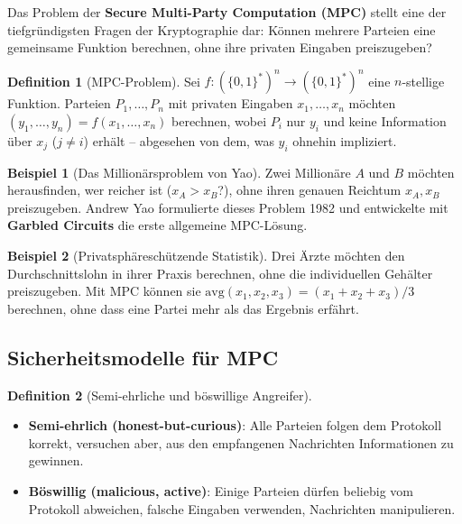 ﻿\documentclass[a4paper,12pt]{scrreprt}
\theoremstyle{definition}
\newtheorem{definition}{Definition}[section]
\newtheorem{beispiel}{Beispiel}[section]
\begin{document}
Das Problem der \textbf{Secure Multi-Party Computation (MPC)} stellt eine der tiefgründigsten Fragen der Kryptographie dar: Können mehrere Parteien eine gemeinsame Funktion berechnen, ohne ihre privaten Eingaben preiszugeben?

\begin{definition}[MPC-Problem]
Sei $f: (\{0,1\}^*)^n \to (\{0,1\}^*)^n$ eine $n$-stellige Funktion. Parteien $P_1,\ldots,P_n$ mit privaten Eingaben $x_1,\ldots,x_n$ möchten $(y_1,\ldots,y_n) = f(x_1,\ldots,x_n)$ berechnen, wobei $P_i$ nur $y_i$ und keine Information über $x_j$ ($j \neq i$) erhält -- abgesehen von dem, was $y_i$ ohnehin impliziert.
\end{definition}

\begin{beispiel}[Das Millionärsproblem von Yao]
Zwei Millionäre $A$ und $B$ möchten herausfinden, wer reicher ist ($x_A > x_B$?), ohne ihren genauen Reichtum $x_A, x_B$ preiszugeben. Andrew Yao formulierte dieses Problem 1982 \cite{Yao82} und entwickelte mit \textbf{Garbled Circuits} die erste allgemeine MPC-Lösung.
\end{beispiel}

\begin{beispiel}[Privatsphäreschützende Statistik]
Drei Ärzte möchten den Durchschnittslohn in ihrer Praxis berechnen, ohne die individuellen Gehälter preiszugeben. Mit MPC können sie $\mathrm{avg}(x_1, x_2, x_3) = (x_1+x_2+x_3)/3$ berechnen, ohne dass eine Partei mehr als das Ergebnis erfährt.
\end{beispiel}

\subsection{Sicherheitsmodelle für MPC}

\begin{definition}[Semi-ehrliche und böswillige Angreifer]
\begin{itemize}
    \item \textbf{Semi-ehrlich (honest-but-curious)}: Alle Parteien folgen dem Protokoll korrekt, versuchen aber, aus den empfangenen Nachrichten Informationen zu gewinnen.
    \item \textbf{Böswillig (malicious, active)}: Einige Parteien dürfen beliebig vom Protokoll abweichen, falsche Eingaben verwenden, Nachrichten manipulieren.
\end{itemize}
\end{definition}
\end{document}
